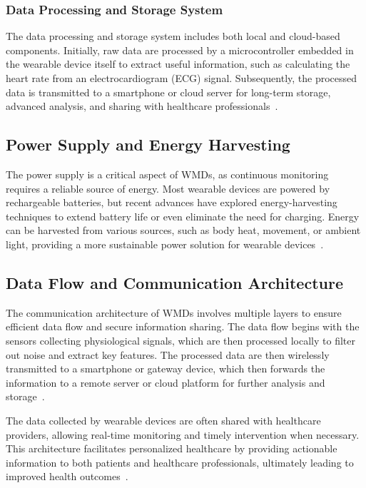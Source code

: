 \documentclass[journal]{IEEEtran}
\begin{document}
        \subsubsection{Data Processing and Storage System}
        
        The data processing and storage system includes both local and cloud-based components. Initially, raw data are processed by a microcontroller embedded in the wearable device itself to extract useful information, such as calculating the heart rate from an electrocardiogram (ECG) signal. Subsequently, the processed data is transmitted to a smartphone or cloud server for long-term storage, advanced analysis, and sharing with healthcare professionals~\cite{Veeravalli2017}.

    \subsection{Power Supply and Energy Harvesting}
    
    The power supply is a critical aspect of WMDs, as continuous monitoring requires a reliable source of energy. Most wearable devices are powered by rechargeable batteries, but recent advances have explored energy-harvesting techniques to extend battery life or even eliminate the need for charging. Energy can be harvested from various sources, such as body heat, movement, or ambient light, providing a more sustainable power solution for wearable devices~\cite{Ates2022}.

    \subsection{Data Flow and Communication Architecture}
    
    The communication architecture of WMDs involves multiple layers to ensure efficient data flow and secure information sharing. The data flow begins with the sensors collecting physiological signals, which are then processed locally to filter out noise and extract key features. The processed data are then wirelessly transmitted to a smartphone or gateway device, which then forwards the information to a remote server or cloud platform for further analysis and storage~\cite{Saifuzzaman2021}.

    The data collected by wearable devices are often shared with healthcare providers, allowing real-time monitoring and timely intervention when necessary. This architecture facilitates personalized healthcare by providing actionable information to both patients and healthcare professionals, ultimately leading to improved health outcomes~\cite{Guk2019}.
\end{document}
